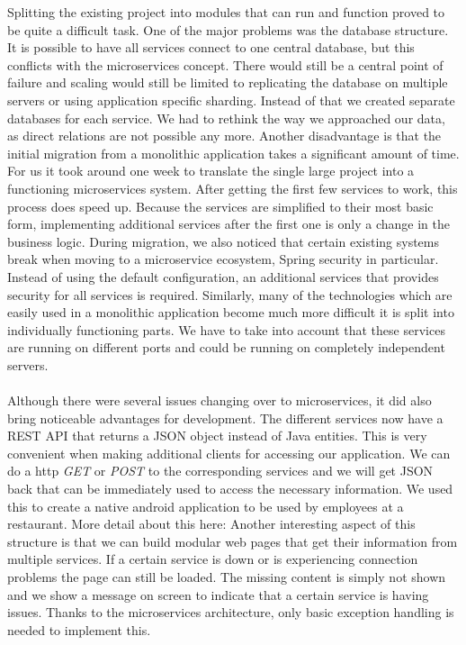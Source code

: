 \documentclass[12pt]{article}
\begin{document}
\begin{multicols}{2}
\noindent Splitting the existing project into modules that can run and function proved to be quite a difficult task. One of the major problems was the database structure. It is possible to have all services connect to one central database, but this conflicts with the microservices concept. There would still be a central point of failure and scaling would still be limited to replicating the database on multiple servers or using application specific sharding. Instead of that we created separate databases for each service. We had to rethink the way we approached our data, as direct relations are not possible any more. Another disadvantage is that the initial migration from a monolithic application takes a significant amount of time. For us it took around one week to translate the single large project into a functioning microservices system. After getting the first few services to work, this process does speed up. Because the services are simplified to their most basic form, implementing additional services after the first one is only a change in the business logic. During migration, we also noticed that certain existing systems break when moving to a microservice ecosystem, Spring security in particular. Instead of using the default configuration, an additional services that provides security for all services is required. Similarly, many of the technologies which are easily used in a monolithic application become much more difficult it is split into individually functioning parts. We have to take into account that these services are running on different ports and could be running on completely independent servers.
\\\\
Although there were several issues changing over to microservices, it did also bring noticeable advantages for development. The different services now have a REST API that returns a JSON object instead of Java entities. This is very convenient when making additional clients for accessing our application. We can do a http \textit{GET} or \textit{POST} to the corresponding services and we will get JSON back that can be immediately used to access the necessary information. We used this to create a native android application to be used by employees at a restaurant. More detail about this here: %
Another interesting aspect of this structure is that we can build modular web pages that get their information from multiple services. If a certain service is down or is experiencing connection problems the page can still be loaded. The missing content is simply not shown and we show a message on screen to indicate that a certain service is having issues. Thanks to the microservices architecture, only basic exception handling is needed to implement this.

\end{multicols}
\end{document}
